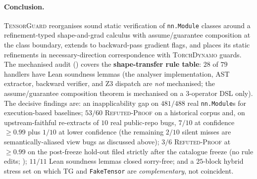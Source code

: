 \paragraph{Conclusion.}
\textsc{TensorGuard} reorganises sound static verification of
\texttt{nn.Module} classes around a refinement-typed
shape-and-grad calculus with assume/guarantee composition at
the class boundary, extends to backward-pass gradient flags,
and places its static refinements in necessary-direction
correspondence with \textsc{TorchDynamo} guards. The
mechanised audit () covers the
\textbf{shape-transfer rule table}: $28$ of $79$ handlers
have Lean soundness lemmas (the analyser implementation, AST
extractor, backward verifier, and Z3 dispatch are
\emph{not} mechanised; the assume/guarantee composition
theorem is mechanised on a $3$-operator DSL only).
The decisive
findings are: an inapplicability gap on $481/488$ real
\texttt{nn.Module}s for execution-based baselines; $53/60$
\textsc{Refuted-Proof} on a historical corpus and, on
upstream-faithful re-extracts of $10$ real public-repo bugs,
$7/10$ at confidence $\ge 0.99$ plus $1/10$ at lower
confidence (the remaining $2/10$ silent misses are
semantically-aliased view bugs as discussed above);
$3/6$ \textsc{Refuted-Proof} at $\ge 0.99$ on the
post-freeze hold-out filed strictly after the catalogue
freeze (no rule edits; );
$11/11$ Lean soundness lemmas closed sorry-free; and a
$25$-block hybrid stress set on which \textsc{TG} and
\texttt{FakeTensor} are \emph{complementary}, not coincident.
